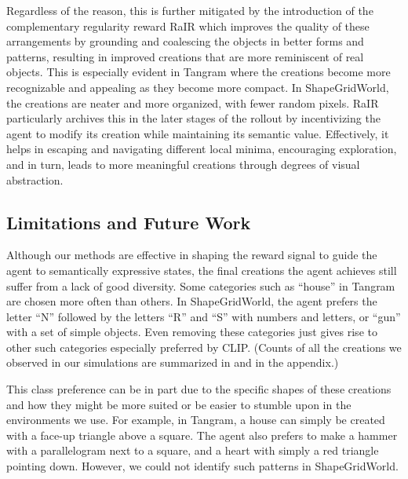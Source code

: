Regardless of the reason, this is further mitigated by the introduction of the complementary regularity reward RaIR which improves the quality of these arrangements by grounding and coalescing the objects in better forms and patterns, resulting in improved creations that are more reminiscent of real objects.
This is especially evident in Tangram where the creations become more recognizable and appealing as they become more compact.
In ShapeGridWorld, the creations are neater and more organized, with fewer random pixels. RaIR particularly archives this in the later stages of the rollout by incentivizing the agent to modify its creation while maintaining its semantic value.
Effectively, it helps in escaping and navigating different local minima, encouraging exploration, and in turn, leads to more meaningful creations through degrees of visual abstraction.

\subsection*{Limitations and Future Work}
\label{sec:future-work}

Although our methods are effective in shaping the reward signal to guide the agent to semantically expressive states, the final creations the agent achieves still suffer from a lack of good diversity.
Some categories such as ``house'' in Tangram are chosen more often than others.
In ShapeGridWorld, the agent prefers the letter ``N'' followed by the letters ``R'' and ``S'' with numbers and letters, or ``gun'' with a set of simple objects.
Even removing these categories just gives rise to other such categories especially preferred by CLIP.
(Counts of all the creations we observed in our simulations are summarized in  and  in the appendix.)

This class preference can be in part due to the specific shapes of these creations and how they might be more suited or be easier to stumble upon in the environments we use.
For example, in Tangram, a house can simply be created with a face-up triangle above a square.
The agent also prefers to make a hammer with a parallelogram next to a square, and a heart with simply a red triangle pointing down.
However, we could not identify such patterns in ShapeGridWorld.


